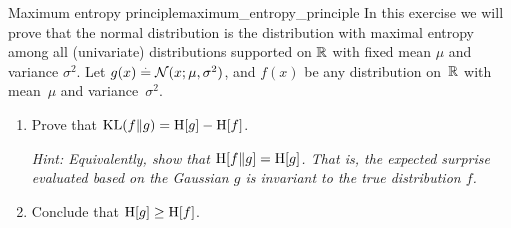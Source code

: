 \begin{nexercise}{Maximum entropy principle}{maximum_entropy_principle}
  In this exercise we will prove that the normal distribution is the distribution with maximal entropy among all (univariate) distributions supported on $\mathbb{R}$ with fixed mean $\mu$ and variance $\sigma^2$.
  Let ${g(x) \defeq \N[x]{\mu}{\sigma^2}}$, and $f(x)$ be any distribution on~$\mathbb{R}$ with mean~$\mu$ and variance~$\sigma^2$.
  \begin{enumerate}
    \item Prove that $\KL{f}{g} = \H{g} - \H{f}$.\par
    \textit{Hint: Equivalently, show that $\crH{f}{g} = \H{g}$.
    That is, the expected surprise evaluated based on the Gaussian $g$ is invariant to the true distribution $f$.}
    \item Conclude that $\H{g} \geq \H{f}$.
  \end{enumerate}
\end{nexercise}

